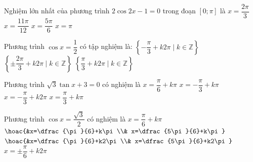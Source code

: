 \begin{ex}%
	Nghiệm lớn nhất của phương trình $2\cos 2x-1=0$ trong  đoạn $\left[0;\pi \right]$ là
	 \choice
		{$x=\dfrac{2\pi}{3}$} 
		{$x=\dfrac{11\pi}{12}$} 
		{\True $x=\dfrac{5\pi}{6}$} 
		{$x=\pi $} 
	 \loigiai{
		Ta có $2\cos 2x-1=0 \Leftrightarrow \cos 2x=\dfrac{1}{2}=\cos \dfrac{\pi}{3}  \Leftrightarrow \left[
		\begin{aligned}
			&x=\dfrac{\pi}{6}+k\pi  \\
			 &x=-\dfrac{\pi}{6}+k\pi
		\end{aligned}\right. (k\in \mathbb{Z})$. \\
	Vì  $x\in \left[0;\pi \right] $ nên $ x\in \left\{\dfrac{\pi}{6};\dfrac{5\pi}{6}\right\}$.}
\end{ex}

\begin{ex}%
	Phương trình $\cos x=\dfrac{1}{2}$ có tập  nghiệm là:
	 \choice
		 {$\left\{-\dfrac{\pi}{3}+k2\pi \mid k \in \mathbb{Z} \right\}$}
		{$\left\{\pm \dfrac{2\pi}{3}+k2\pi  \mid k \in \mathbb{Z} \right\}$}
		{$\left\{\dfrac{\pi}{3}+k2\pi \mid k \in \mathbb{Z} \right\}$} 
		{}
\end{ex}

\begin{ex}%
	Phương trình  $\sqrt{3}\tan x+3=0$ có nghiệm là
	 \choice
		 {$x=\dfrac{\pi}{6}+k\pi$}
		{\True  $x=-\dfrac{\pi}{3}+k\pi$}
		 {$x=-\dfrac{\pi}{3}+k2\pi$}
		{$x=\dfrac{\pi}{3}+k\pi$} 
\end{ex}

\begin{ex}%
	Phương trình $\cos x  =\dfrac{\sqrt{3}}{2}$ có nghiệm là
	 \choice
		{$x=  \dfrac{\pi}{6}+k\pi$}
		{$\hoac {&x=\dfrac{\pi}{6}+k\pi \\& x=\dfrac{5\pi}{6}+k\pi}$} 
		 {$\hoac {&x=\dfrac{\pi}{6}+k2\pi \\& x=\dfrac{5\pi}{6}+k2\pi}$}
		 {\True $x= \pm \dfrac{\pi}{6}+k2\pi $}
\end{ex}

